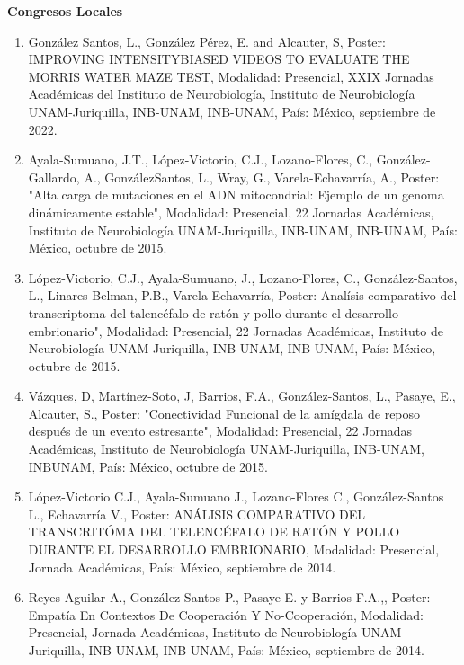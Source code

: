 \textbf{Congresos Locales}

\hfill

\begin{enumerate}

\item  González Santos, L., González Pérez, E. and Alcauter, S, Poster: IMPROVING INTENSITYBIASED VIDEOS TO EVALUATE THE MORRIS 
WATER MAZE TEST, Modalidad: Presencial, XXIX Jornadas Académicas del Instituto de Neurobiología, Instituto de Neurobiología 
UNAM-Juriquilla, INB-UNAM, INB-UNAM, País: México, septiembre de 2022.

\item  Ayala-Sumuano, J.T., López-Victorio, C.J., Lozano-Flores, C., González-Gallardo, A., GonzálezSantos, L., Wray, G., 
Varela-Echavarría, A., Poster: "Alta carga de mutaciones en el ADN mitocondrial: Ejemplo de un genoma dinámicamente 
estable", Modalidad: Presencial, 22 Jornadas Académicas, Instituto de Neurobiología UNAM-Juriquilla, INB-UNAM, INB-UNAM, 
País: México, octubre de 2015.


\item  López-Victorio, C.J., Ayala-Sumuano, J., Lozano-Flores, C., González-Santos, L., Linares-Belman, P.B., 
Varela Echavarría, Poster: Analísis comparativo del transcriptoma del talencéfalo de ratón y pollo durante el desarrollo 
embrionario", Modalidad: Presencial, 22 Jornadas Académicas, Instituto de Neurobiología UNAM-Juriquilla, INB-UNAM, 
INB-UNAM, País: México, octubre de 2015.

\item  Vázques, D, Martínez-Soto, J, Barrios, F.A., González-Santos, L., Pasaye, E., Alcauter, S., Poster: "Conectividad 
Funcional de la amígdala de reposo después de un evento estresante", Modalidad: Presencial, 22 Jornadas Académicas, 
Instituto de Neurobiología UNAM-Juriquilla, INB-UNAM, INBUNAM, País: México, octubre de 
2015.

\item  López-Victorio C.J., Ayala-Sumuano J., Lozano-Flores C., González-Santos L., Echavarría V., Poster: ANÁLISIS COMPARATIVO 
DEL TRANSCRITÓMA DEL TELENCÉFALO DE RATÓN Y POLLO DURANTE EL DESARROLLO EMBRIONARIO, Modalidad: Presencial, Jornada 
Académicas, País: México, septiembre de 2014.

\item  Reyes-Aguilar A., González-Santos P., Pasaye E. y Barrios F.A.,, Poster: Empatía En Contextos De Cooperación Y 
No-Cooperación, Modalidad: Presencial, Jornada Académicas, Instituto de Neurobiología UNAM-Juriquilla, INB-UNAM, INB-UNAM, 
País: México, septiembre de 2014.


\end{enumerate}
